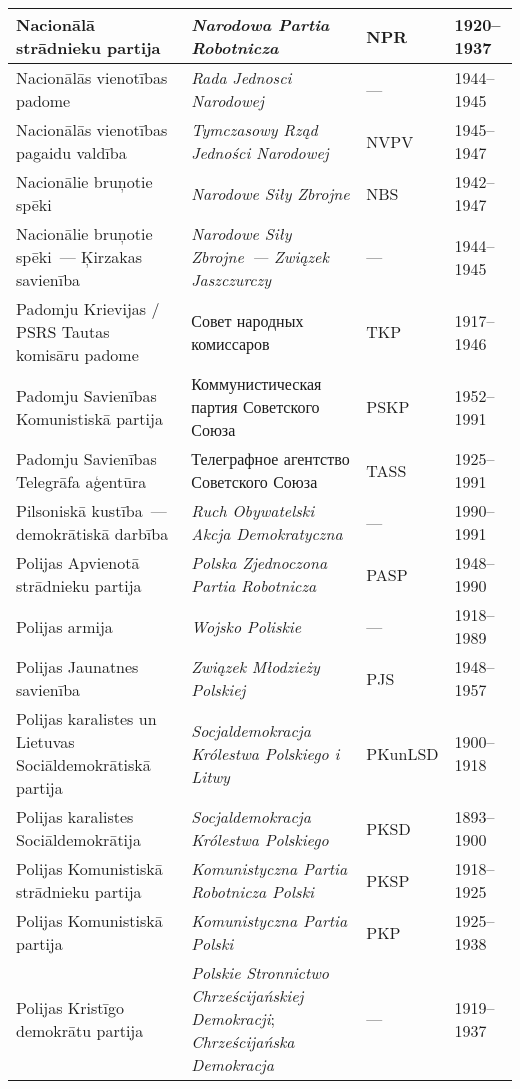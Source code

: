 \documentclass[twoside,a5paper,12pt,fleqn,openany]{extbook}
\newcommand{\pltxti}[1]{\textit{\textpolish{#1}}}
\newcommand{\rutxti}[1]{\textrussian{#1}}
\begin{document}
\begin{footnotesize}
\begin{tabularx}{\linewidth}{|p{3cm}|p{3.5cm}|p{1.4cm}|p{1.6cm}|}
\hline
Nacionālā strādnieku partija & \pltxti{Narodowa Partia Robotnicza} & NPR & 1920--1937 \\
\hline
Nacionālās vienotības padome & \pltxti{Rada Jednosci Narodowej} & --- & 1944--1945 \\
\hline
Nacionālās vienotības pagaidu valdība & \pltxti{Tymczasowy Rząd Jedności Narodowej} & NVPV & 1945--1947 \\
\hline
Nacionālie bruņotie spēki & \pltxti{Narodowe Siły Zbrojne} & NBS & 1942--1947 \\
\hline
Nacionālie bruņotie spēki~--- Ķirzakas savienība & \pltxti{Narodowe Siły Zbrojne~--- Związek Jaszczurczy} & --- & 1944--1945 \\
\hline
Padomju Krievijas / PSRS Tautas komisāru padome & \rutxti{Совет народных комиссаров} & TKP & 1917--1946 \\
\hline
Padomju Savienības Komunistiskā partija & \rutxti{Коммунистическая партия Советского Союза} & PSKP & 1952--1991 \\
\hline
Padomju Savienības Telegrāfa aģentūra & \rutxti{Телеграфное агентство Советского Союза} & TASS & 1925--1991 \\
\hline
Pilsoniskā kustība~--- demokrātiskā darbība & \pltxti{Ruch Obywatelski Akcja Demokratyczna} & --- & 1990--1991 \\
\hline
Polijas Apvienotā strādnieku partija & \pltxti{Polska Zjednoczona Partia Robotnicza} & PASP & 1948--1990 \\
\hline
Polijas armija & \pltxti{Wojsko Poliskie} & --- & 1918--1989 \\
\hline
Polijas Jaunatnes savienība & \pltxti{Związek Młodzieży Polskiej} & PJS & 1948--1957 \\
\hline
Polijas karalistes un Lietuvas Sociāldemokrātiskā partija & \pltxti{Socjaldemokracja Królestwa Polskiego i Litwy} & PKunLSD & 1900--1918 \\
\hline
Polijas karalistes Sociāldemokrātija & \pltxti{Socjaldemokracja Królestwa Polskiego} & PKSD & 1893--1900 \\
\hline
Polijas Komunistiskā strādnieku partija & \pltxti{Komunistyczna Partia Robotnicza Polski} & PKSP & 1918--1925 \\
\hline
Polijas Komunistiskā partija & \pltxti{Komunistyczna Partia Polski} & PKP & 1925--1938 \\
\hline
Polijas Kristīgo demokrātu partija & \pltxti{Polskie Stronnictwo Chrześcijańskiej Demokracji}; \pltxti{Chrześcijańska Demokracja} & --- & 1919--1937 \\

\end{tabularx}
\end{footnotesize}
\end{document}
